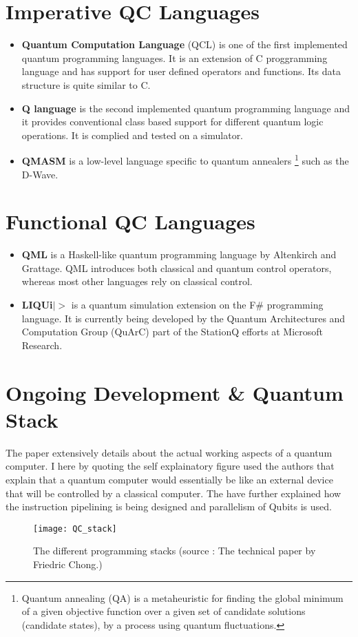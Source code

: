 \section{Imperative QC Languages}
\begin{itemize}
\item{
\textbf{Quantum Computation Language} (QCL)\cite{qcl} is one of the first implemented quantum programming languages. It is an extension of C proggramming language and has support for user defined operators and functions. Its data structure is quite similar to C.
}
\item{
	\textbf{Q language} is the second implemented quantum programming language and it provides conventional class based support for different quantum logic operations. It is complied and tested on a simulator.
}
\item{
	\textbf{QMASM}\cite{QMASM} is a low-level language specific to quantum annealers \footnote{Quantum annealing (QA) is a metaheuristic for finding the global minimum of a given objective function over a given set of candidate solutions (candidate states), by a process using quantum fluctuations.} such as the D-Wave.
}
\end{itemize}

\section{Functional QC Languages}
\begin{itemize}
\item{
\textbf{QML} is a Haskell-like quantum programming language by Altenkirch and Grattage. QML introduces both classical and quantum control operators, whereas most other languages rely on classical control. 
}
\item{
	\textbf{LIQUi$|>$}\cite{liqui} is a quantum simulation extension on the F\# programming language. It is currently being developed by the Quantum Architectures and Computation Group (QuArC) part of the StationQ efforts at Microsoft Research.
}
\end{itemize}

\section{Ongoing Development \& Quantum Stack}
The paper \cite{quantumstack} extensively details about the actual working aspects of a quantum computer. I here by quoting the self explainatory figure used the authors that explain that a quantum computer would essentially be like an external device that will be controlled by a classical computer. The have further explained how the instruction pipelining is being designed and parallelism of Qubits is used.

\begin{figure}[!htb]
\centering
  \texttt{[image: QC\_stack]}
  \caption{ The different programming stacks (source : The technical paper by Friedric Chong.\protect\cite{quantumstack})}
\end{figure}
